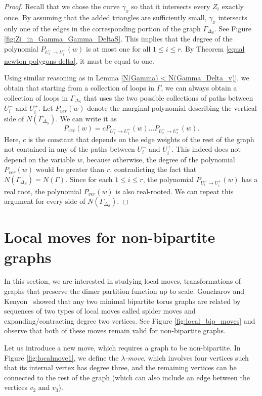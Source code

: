 \documentclass[12pt,a4paper]{article}
\theoremstyle{definition}
\begin{document}
\begin{proof}
    Recall that we chose the curve $\gamma_x$ so that it intersects every $Z_i$ exactly once. By assuming that the added triangles are sufficiently small, $\gamma_x$ intersects only one of the edges in the corresponding portion of the graph $\Gamma_{\Delta_S}$. See Figure \ref{fig:Zi_in_Gamma_Gamma_DeltaS}. This implies that the degree of the polynomial $P_{U^-_{i} \to U^+_{i}}(w)$ is at most one for all $1 \leq i \leq r$. By Theorem \ref{equal newton polygons delta}, it must be equal to one.

    Using similar reasoning as in Lemma \ref{N(Gamma) < N(Gamma_Delta_v)}, we obtain that starting from a collection of loops in $\Gamma$, we can always obtain a collection of loops in $\Gamma_{\Delta_S}$ that uses the two possible collections of paths between $U^-_{i}$ and $U^+_{i}$. Let $P_{ver}(w)$ denote the marginal polynomial describing the vertical side of $N(\Gamma_{\Delta_S})$. We can write it as
    \[P_{ver}(w) = c P_{U^-_{1} \to U^+_{1}}(w) \dots P_{U^-_{r} \to U^+_{r}}(w).\]
    Here, $c$ is the constant that depends on the edge weights of the rest of the graph not contained in any of the paths between $U^-_{i}$ and $U^+_{i}$. This indeed does not depend on the variable $w$, because otherwise, the degree of the polynomial $P_{ver}(w)$ would be greater than $r$, contradicting the fact that $N(\Gamma_{\Delta_S}) = N(\Gamma)$. Since for each $1 \leq i \leq r$, the polynomial $P_{U^-_{i} \to U^+_{i}}(w)$ has a real root, the polynomial $P_{ver}(w)$ is also real-rooted. We can repeat this argument for every side of $N(\Gamma_{\Delta_S})$.
\end{proof}

\section{Local moves for non-bipartite graphs} \label{local_moves}

In this section, we are interested in studying local moves, transformations of graphs that preserve the dimer partition function up to scale. Goncharov and Kenyon~\cite{GoncharovKenyon} showed that any two minimal bipartite torus graphs are related by sequences of two types of local moves called spider moves and expanding/contracting degree two vertices. See Figure \ref{fig:local_bip_moves} and observe that both of these moves remain valid for non-bipartite graphs. 

Let us introduce a new move, which requires a graph to be non-bipartite. In Figure \ref{fig:localmove1}, we define the \emph{$\lambda$-move}, which involves four vertices such that its internal vertex has degree three, and the remaining vertices can be connected to the rest of the graph (which can also include an edge between the vertices $v_2$ and $v_3$). 
\end{document}
